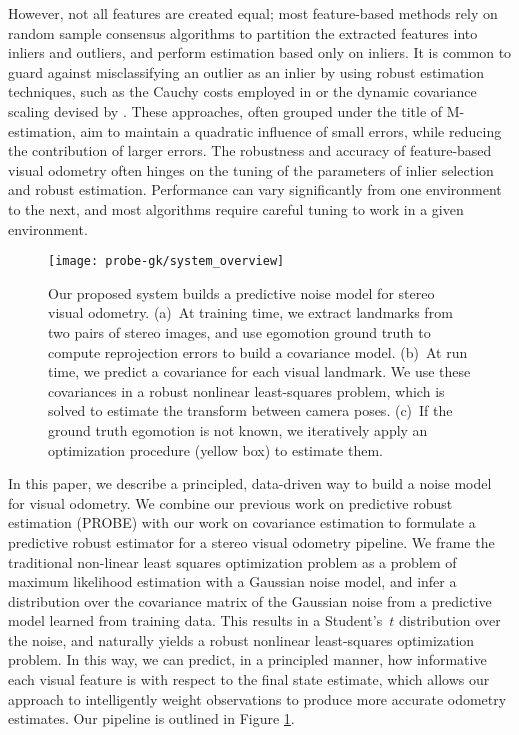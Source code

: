 However, not all features are created equal; most feature-based methods rely on
random sample consensus algorithms \citep{fischler1981random} to partition the extracted features
into inliers and outliers, and perform estimation based only on inliers. It is
common to guard against misclassifying an outlier as an inlier by using robust
estimation techniques, such as the Cauchy costs employed in
\citet{kerl2013robust} or the dynamic covariance scaling devised
by \citet{Burgard:ii}. These approaches, often grouped under the title of M-estimation, aim to maintain a quadratic influence
of small errors, while reducing the contribution of larger errors. The
robustness and accuracy of feature-based visual odometry often hinges on the
tuning of the parameters of inlier selection and robust estimation. Performance
can vary significantly from one environment to the next, and most algorithms require
careful tuning to work in a given environment. 

\begin{figure}
    \centering
      \texttt{[image: probe-gk/system\_overview]}
      \caption{Our proposed system builds a predictive noise model for stereo visual odometry. (a)~At training
        time, we extract landmarks from two pairs of stereo images,
        and use egomotion ground truth to compute reprojection errors to build a covariance
        model. (b)~At run time, we predict a covariance for each visual landmark. We use these covariances in a robust nonlinear least-squares
        problem, which is solved to estimate the transform between camera poses.
        (c)~If the ground truth egomotion is not known, we iteratively apply an
        optimization procedure (yellow box) to estimate them.}
        \vspace{-1em}
    \label{fig:probe_gk_system}
\end{figure}

In this paper, we describe a principled, data-driven way to build a noise model
for visual odometry. We combine our previous work \citep{peretroukhin2015PROBE}
on predictive robust estimation (PROBE) with our work on covariance estimation
\citep{VegaBrown:2013fv} to formulate a predictive robust estimator for a
stereo visual odometry pipeline. We frame the traditional non-linear least
squares optimization problem as a problem of maximum likelihood estimation with
a Gaussian noise model, and infer a distribution over the covariance matrix of
the Gaussian noise from a predictive model learned from training data. This
results in a Student's~$t$ distribution over the noise, and naturally yields a
robust nonlinear least-squares optimization problem.  In this way, we can predict,
in a principled manner, how informative each visual feature is with respect to the final state
estimate, which allows our approach to intelligently weight observations to
produce more accurate odometry estimates.  Our pipeline is outlined in
Figure \ref{fig:probe_gk_system}.

